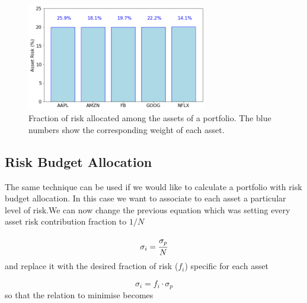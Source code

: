 \begin{figure}[htb]
	\centering
	\includegraphics[width=0.7\textwidth]{figures/risk_parity}
	\caption{Fraction of risk allocated among the assets of a portfolio. The blue numbers show the corresponding weight of each asset.}
	\label{fig:risk_parity}
\end{figure}

\subsection{Risk Budget Allocation}
\label{risk-budget-allocation}

The same technique can be used if we would like to calculate a portfolio with risk budget allocation. In this case we want to associate to each asset a particular level of risk.We can now change the previous equation which was setting every asset risk contribution fraction to $1/N$

\begin{equation} 
\sigma _{i}=\cfrac{\sigma_p}{N} 
\end{equation}
and replace it with the desired fraction of risk (\(f_i\)) specific for each asset

\begin{equation} 
\sigma _{i}=f_i \cdot \sigma_p 
\end{equation}
so that the relation to minimise becomes

